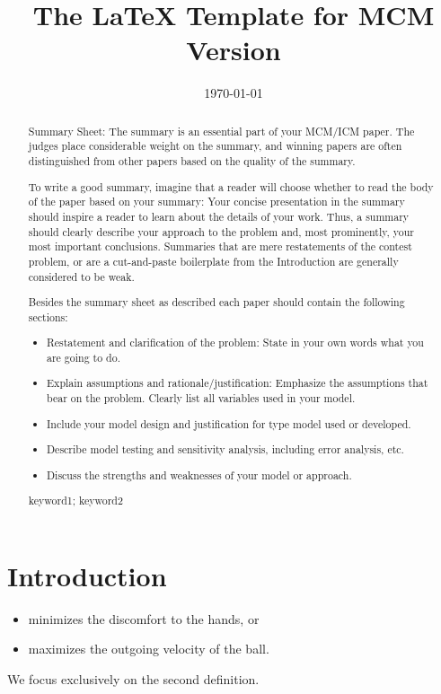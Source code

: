 \documentclass{mcmthesis}
\title{The \LaTeX{} Template for MCM Version \MCMversion}
\date{\today}
\begin{document}
\begin{abstract}

Summary Sheet: The summary is an essential part of your MCM/ICM paper. The judges place considerable weight on the summary, and winning papers are often distinguished from other papers based on the quality of the summary.

To write a good summary, imagine that a reader will choose whether to read the body of the paper based on your summary: Your concise presentation in the summary should inspire a reader to learn about the details of your work. Thus, a summary should clearly describe your approach to the problem and, most prominently, your most important conclusions.  Summaries that are mere restatements of the contest problem, or are a cut-and-paste boilerplate from the Introduction are generally considered to be weak.

Besides the summary sheet as described each paper should contain the following sections:

\begin{itemize}
\item Restatement and clarification of the problem: State in your own words what you are going to do.
\item Explain assumptions and rationale/justification: Emphasize the assumptions that bear on the problem. Clearly list all variables used in your model.
\item Include your model design and justification for type model used or developed.
\item Describe model testing and sensitivity analysis, including error analysis, etc.
\item Discuss the strengths and weaknesses of your model or approach.
\end{itemize}

\begin{keywords}
keyword1; keyword2
\end{keywords}

\end{abstract}
\maketitle
\section{Introduction}


\begin{itemize}
\item minimizes the discomfort to the hands, or
\item maximizes the outgoing velocity of the ball.
\end{itemize}
We focus exclusively on the second definition.
\end{document}
